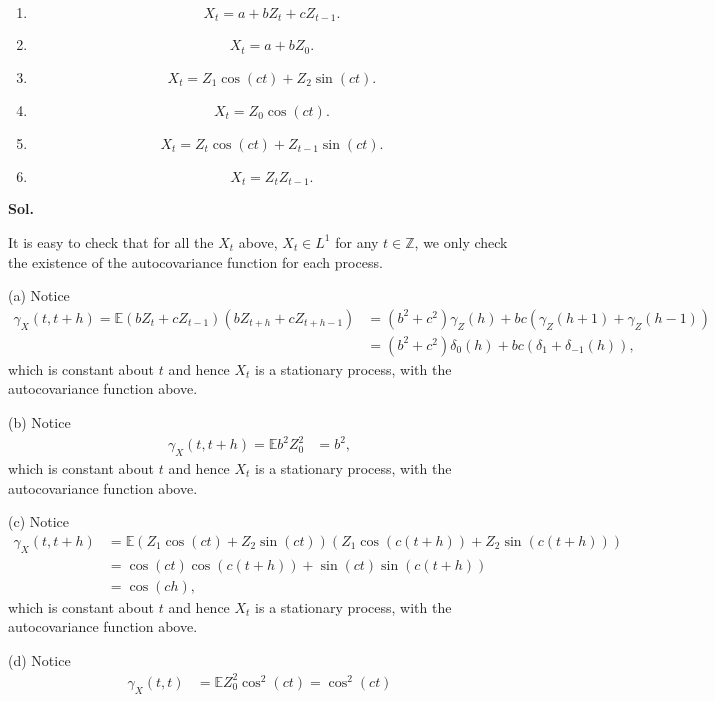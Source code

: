\documentclass[lang=en,11pt,a4paper,citestyle =authoryear]{elegantpaper}
\begin{document}
\begin{enumerate}
    \item[(a)]
    \[
    X_t=a+bZ_t+cZ_{t-1}.
    \]

    \item[(b)]
    \[
    X_t=a+bZ_0.
    \]

    \item[(c)]
    \[
    X_t=Z_1\cos(ct)+Z_2\sin(ct).
    \]

    \item[(d)]
    \[
    X_t=Z_0\cos(ct).
    \]

    \item[(e)]
    \[
    X_t=Z_t\cos(ct)+Z_{t-1}\sin(ct).
    \]

    \item[(f)]
    \[
    X_t=Z_tZ_{t-1}.
    \]
\end{enumerate}
\vspace{0.5em}
\textbf{Sol.} \par
It is easy to check that for all the $X_t$ above, $X_t \in L^1$ for any $t\in\mathbb{Z}$, we only check the existence of the autocovariance function for each process.\par
(a) Notice
\[
\begin{aligned}
    \gamma_X(t,t+h) = \mathbb{E}(bZ_t+cZ_{t-1})(bZ_{t+h}+cZ_{t+h-1}) &= (b^2+c^2)\gamma_Z(h) + bc(\gamma_{Z}(h+1)+\gamma_Z({h-1})) \\
    &= (b^2+c^2)\delta_0(h) + bc(\delta_{1}+\delta_{-1}(h)),
\end{aligned} 
\]
which is constant about $t$ and hence $X_t$ is a stationary process, with the autocovariance function above.\par
(b) Notice
\[
\begin{aligned}
    \gamma_X(t,t+h) = \mathbb{E}b^2Z_0^2 &= b^2,
\end{aligned} 
\]
which is constant about $t$ and hence $X_t$ is a stationary process, with the autocovariance function above.\par
(c) Notice
\[
\begin{aligned}
    \gamma_X(t,t+h) &= \mathbb{E}(Z_1\cos(ct) +Z_2 \sin(ct))(Z_1\cos(c(t+h)) +Z_2 \sin(c(t+h))) \\ &= \cos(ct)\cos(c(t+h)) + \sin(ct)\sin(c(t+h)) \\
    &=\cos(ch),
\end{aligned} 
\]
which is constant about $t$ and hence $X_t$ is a stationary process, with the autocovariance function above.\par
(d) Notice
\[
\begin{aligned}
    \gamma_X(t,t) &= \mathbb{E}Z_0^2\cos^2(ct) = \cos^2(ct)
\end{aligned} 
\]
\end{document}
